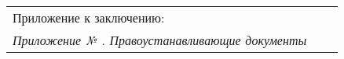 \begin{longtable}{G{25mm}|M{44mm}|G{70mm}}
\relax
\noindent Приложение к заключению:\\
\textit{
	Приложение № \Rownum. Правоустанавливающие документы}
%

\end{longtable}
